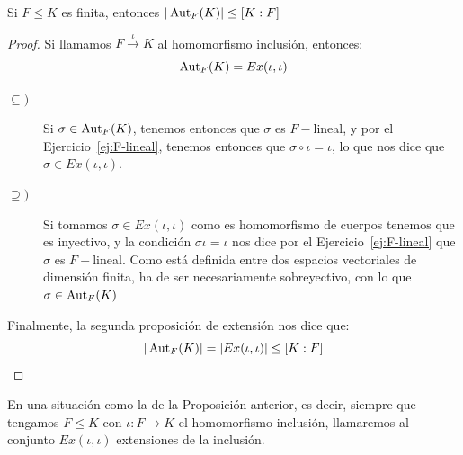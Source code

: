 \begin{prop}\label{prop:comienzo_chap_2}
    Si $F\leq K$ es finita, entonces $|\operatorname{Aut}_F(K)| \leq [K:F]$
    \begin{proof}
        Si llamamos $F\stackrel{\iota}{\to}K$ al homomorfismo inclusión, entonces:
        \begin{equation*}
            \operatorname{Aut}_F(K) = Ex(\iota, \iota)
        \end{equation*}
        \begin{description}
            \item [$\subseteq )$] Si $\sigma\in \operatorname{Aut}_F(K)$, tenemos entonces que $\sigma$ es $F-$lineal, y por el Ejercicio~\ref{ej:F-lineal}, tenemos entonces que $\sigma\circ\iota = \iota$, lo que nos dice que $\sigma\in Ex(\iota,\iota)$.
            \item [$\supseteq )$] Si tomamos $\sigma\in Ex(\iota,\iota)$ como es homomorfismo de cuerpos tenemos que es inyectivo, y la condición $\sigma\iota = \iota$ nos dice por el Ejercicio~\ref{ej:F-lineal} que $\sigma$ es $F-$lineal. Como está definida entre dos espacios vectoriales de dimensión finita, ha de ser necesariamente sobreyectivo, con lo que $\sigma\in \operatorname{Aut}_F(K)$
        \end{description}
        Finalmente, la segunda proposición de extensión nos dice que:
        \begin{equation*}
            |\operatorname{Aut}_F(K)| = |Ex(\iota,\iota)| \leq [K:F]
        \end{equation*}
    \end{proof}
\end{prop}

\begin{notacion}
    En una situación como la de la Proposición anterior, es decir, siempre que tengamos $F\leq K$ con $\iota:F\to K$ el homomorfismo inclusión, llamaremos al conjunto $Ex(\iota,\iota)$ extensiones de la inclusión.
\end{notacion}

